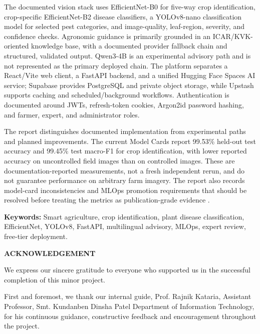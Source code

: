 \documentclass[12pt,a4paper,oneside,openany]{report}
\begin{document}
The documented vision stack uses EfficientNet-B0 for five-way crop identification, crop-specific EfficientNet-B2 disease classifiers, a YOLOv8-nano classification model for selected pest categories, and image-quality, leaf-region, severity, and confidence checks. Agronomic guidance is primarily grounded in an ICAR/KVK-oriented knowledge base, with a documented provider fallback chain and structured, validated output. Qwen3-4B is an experimental advisory path and is not represented as the primary deployed chain. The platform separates a React/Vite web client, a FastAPI backend, and a unified Hugging Face Spaces AI service; Supabase provides PostgreSQL and private object storage, while Upstash supports caching and scheduled/background workflows. Authentication is documented around JWTs, refresh-token cookies, Argon2id password hashing, and farmer, expert, and administrator roles.

The report distinguishes documented implementation from experimental paths and planned improvements. The current Model Cards report 99.53\% held-out test accuracy and 99.45\% test macro-F1 for crop identification, with lower reported accuracy on uncontrolled field images than on controlled images. These are documentation-reported measurements, not a fresh independent rerun, and do not guarantee performance on arbitrary farm imagery. The report also records model-card inconsistencies and MLOps promotion requirements that should be resolved before treating the metrics as publication-grade evidence \cite{model_cards}.

\vspace{0.20cm}
\noindent\textbf{Keywords:} Smart agriculture, crop identification, plant disease classification, EfficientNet, YOLOv8, FastAPI, multilingual advisory, MLOps, expert review, free-tier deployment.

\clearpage
{}
{}
\begin{center}
{\bfseries\large ACKNOWLEDGEMENT}
\end{center}
\vspace{0.25cm}
We express our sincere gratitude to everyone who supported us in the successful completion of this minor project.

First and foremost, we thank our internal guide, Prof. Rajnik Kataria, Assistant Professor, Smt. Kundanben Dinsha Patel Department of Information Technology, for his continuous guidance, constructive feedback and encouragement throughout the project.
\end{document}
